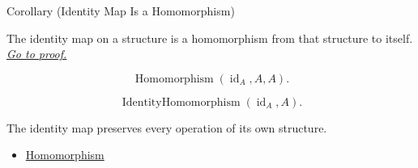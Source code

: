 \begin{corollarybox}{Corollary (Identity Map Is a Homomorphism)}
\begin{corollary}
\label{cor:identity-map-is-homomorphism}
The identity map on a structure is a homomorphism from that structure to
itself.
\hyperref[prf:identity-map-is-homomorphism]{\textit{Go to proof.}}
\end{corollary}
\end{corollarybox}

\begin{remark*}
\[
\operatorname{Homomorphism}(\operatorname{id}_A,A,A).
\]
\end{remark*}

\begin{remark*}
\[
\operatorname{IdentityHomomorphism}(\operatorname{id}_A,A).
\]
\end{remark*}

\begin{remark*}[Interpretation]
The identity map preserves every operation of its own structure.
\end{remark*}

\begin{dependencies}
\begin{itemize}
  \item \hyperref[def:homomorphism]{Homomorphism}
\end{itemize}
\end{dependencies}

